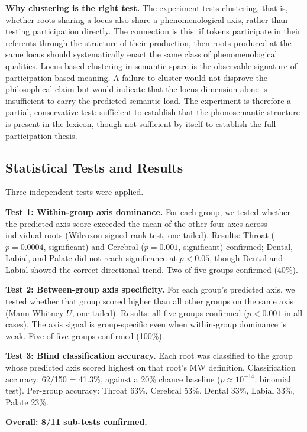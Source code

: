 \documentclass[12pt]{article}
\begin{document}
\textbf{Why clustering is the right test.} The experiment tests clustering, that is, whether roots sharing a locus also share a phenomenological axis, rather than testing participation directly. The connection is this: if tokens participate in their referents through the structure of their production, then roots produced at the same locus should systematically enact the same class of phenomenological qualities. Locus-based clustering in semantic space is the observable signature of participation-based meaning. A failure to cluster would not disprove the philosophical claim but would indicate that the locus dimension alone is insufficient to carry the predicted semantic load. The experiment is therefore a partial, conservative test: sufficient to establish that the phonosemantic structure is present in the lexicon, though not sufficient by itself to establish the full participation thesis.

\subsection{Statistical Tests and Results}

Three independent tests were applied.

\textbf{Test 1: Within-group axis dominance.} For each group, we tested whether the predicted axis score exceeded the mean of the other four axes across individual roots (Wilcoxon signed-rank test, one-tailed). Results: Throat ($p = 0.0004$, significant) and Cerebral ($p = 0.001$, significant) confirmed; Dental, Labial, and Palate did not reach significance at $p < 0.05$, though Dental and Labial showed the correct directional trend. Two of five groups confirmed (40\%).

\textbf{Test 2: Between-group axis specificity.} For each group's predicted axis, we tested whether that group scored higher than all other groups on the same axis (Mann-Whitney $U$, one-tailed). Results: all five groups confirmed ($p < 0.001$ in all cases). The axis signal is group-specific even when within-group dominance is weak. Five of five groups confirmed (100\%).

\textbf{Test 3: Blind classification accuracy.} Each root was classified to the group whose predicted axis scored highest on that root's MW definition. Classification accuracy: 62/150 = 41.3\%, against a 20\% chance baseline ($p \approx 10^{-14}$, binomial test). Per-group accuracy: Throat 63\%, Cerebral 53\%, Dental 33\%, Labial 33\%, Palate 23\%.

\textbf{Overall: 8/11 sub-tests confirmed.}
\end{document}
